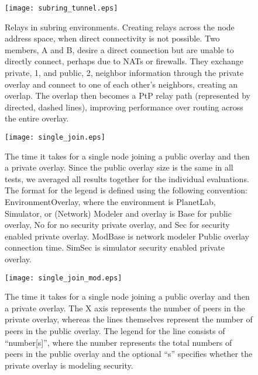 

\begin{figure}[ht]
\centering
\texttt{[image: subring\_tunnel.eps]}
\caption[Relays in subring environments.]{Relays in subring environments.
Creating relays across the node address space, when direct connectivity is not
possible.  Two members, A and B, desire a direct connection but are unable to
directly connect, perhaps due to NATs or firewalls.  They exchange private, 1,
and public, 2, neighbor information through the private overlay and connect to
one of each other's neighbors, creating an overlap.  The overlap then becomes a
PtP relay path (represented by directed, dashed lines), improving performance
over routing across the entire overlay.}
\label{fig:overlay_relay}
\end{figure}

\begin{figure}[ht]
\centering
\texttt{[image: single\_join.eps]}
\caption[Time taken by a single node to join public and private overlays.]{The
time it takes for a single node joining a public overlay and then a private
overlay. Since the public overlay size is the same in all tests, we averaged
all results together for the individual evaluations.  The format for the
legend is defined using the following convention: EnvironmentOverlay, where the
environment is PlanetLab, Simulator, or (Network) Modeler and overlay is Base
for public overlay, No for no security private overlay, and Sec for security
enabled private overlay. ModBase is network modeler Public overlay connection
time.  SimSec is simulator security enabled private overlay.}
\label{fig:single_join}
\end{figure}

\begin{figure}[ht]
\centering
\texttt{[image: single\_join\_mod.eps]}
\caption[Time taken by a single node to join large public and private
overlays.]{The time it takes for a single node joining a public
overlay and then a private overlay. The X axis represents the number of peers
in the private overlay, whereas the lines themselves represent the number of
peers in the public overlay.  The legend for the line consists of
``number[s]'', where the number represents the total numbers of peers in the
public overlay and the optional ``s'' specifies whether the private overlay is
modeling security.}
\label{fig:single_join_mod}
\end{figure}

